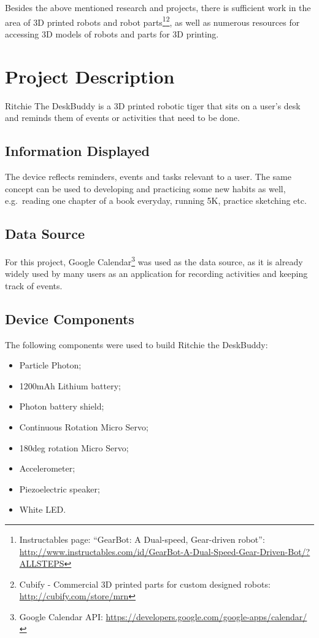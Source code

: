 \documentclass{sigchi-ext}
\begin{document}
Besides the above mentioned research and projects, there is sufficient work in
the area of 3D printed robots and robot parts\cite{megaro2015interactive,
schulz2015interactive}\footnote{Instructables page: ``GearBot: A Dual-speed,
Gear-driven robot'':
\url{http://www.instructables.com/id/GearBot-A-Dual-Speed-Gear-Driven-Bot/?ALLSTEPS}}\footnote{Cubify
- Commercial 3D printed parts for custom designed robots:
\url{http://cubify.com/store/mrn}}, as well as numerous resources for accessing 3D
models of robots and parts for 3D printing.

\section{Project Description}

Ritchie The DeskBuddy is a 3D printed robotic tiger that sits on a user's desk
and reminds them of events or activities that need to be done.

\subsection{Information Displayed}

The device reflects reminders, events and tasks relevant to a user. The same
concept can be used to developing and practicing some new habits as well, e.g.\
reading one chapter of a book everyday, running 5K, practice sketching etc.

\subsection{Data Source}

For this project, Google Calendar\footnote{Google Calendar API:
  \url{https://developers.google.com/google-apps/calendar/}} was used as the data
source, as it is already widely used by many users as an application for
recording activities and keeping track of events.

\subsection{Device Components}

The following components were used to build Ritchie the DeskBuddy:

\begin{itemize}
  \item Particle Photon;
  \item 1200mAh Lithium battery;
  \item Photon battery shield;
  \item Continuous Rotation Micro Servo;
  \item 180deg rotation Micro Servo;
  \item Accelerometer;
  \item Piezoelectric speaker;
  \item White LED.
\end{itemize}
\end{document}
